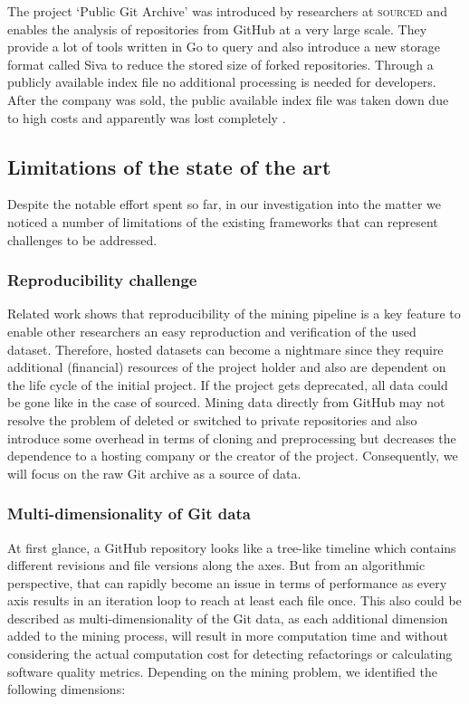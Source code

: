 The project `Public Git Archive' was introduced by researchers at \textsc{sourced} and enables the analysis of repositories from GitHub at a very large scale. They provide a lot of tools written in Go to query and also introduce a new storage format called Siva to reduce the stored size of forked repositories. Through a publicly available index file no additional processing is needed for developers. After the company was sold, the public available index file was taken down due to high costs and apparently was lost completely \cite{srcdissue}.

\subsection{Limitations of the state of the art}
Despite the notable effort spent so far, in our investigation into the matter we noticed a number of limitations of the existing frameworks that can represent challenges to be addressed. 

\subsubsection{Reproducibility challenge}
Related work shows that reproducibility of the mining pipeline is a key feature to enable other researchers an easy reproduction and verification of the used dataset. Therefore, hosted datasets can become a nightmare since they require additional (financial) resources of the project holder and also are dependent on the life cycle of the initial project. If the project gets deprecated, all data could be gone like in the case of sourced. Mining data directly from GitHub may not resolve the problem of deleted or switched to private repositories and also introduce some overhead in terms of cloning and preprocessing but decreases the dependence to a hosting company or the creator of the project. Consequently, we will focus on the raw Git archive as a source of data.

\subsubsection{Multi-dimensionality of Git data}
At first glance, a GitHub repository looks like a tree-like timeline which contains different revisions and file versions along the axes. But from an algorithmic perspective, that can rapidly become an issue in terms of performance as every axis results in an iteration loop to reach at least each file once. This also could be described as multi-dimensionality of the Git data, as each additional dimension added to the mining process, will result in more computation time and without considering the actual computation cost for detecting refactorings or calculating software quality metrics. Depending on the mining problem, we identified the following dimensions:

